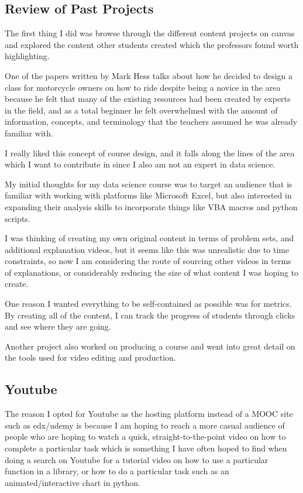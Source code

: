 \documentclass[
	letterpaper, %
]{jdf}
\begin{document}
\subsection{Review of Past Projects}
The first thing I did was browse through the different content projects on canvas and explored the content other students created which the professors found worth highlighting. 

One of the papers written by Mark Hess \cite{hess1} talks about how he decided to design a class for motorcycle owners on how to ride despite being a novice in the area because he felt that many of the existing resources had been created by experts in the field, and as a total beginner he felt overwhelmed with the amount of information, concepts, and terminology that the teachers assumed he was already familiar with.

I really liked this concept of course design, and it falls along the lines of the area which I want to contribute in since I also am not an expert in data science.

My initial thoughts for my data science course was to target an audience that is familiar with working with platforms like Microsoft Excel, but also interested in expanding their analysis skills to incorporate things like VBA macros and python scripts.

I was thinking of creating my own original content in terms of problem sets, and additional explanation videos, but it seems like this was unrealistic due to time constraints, so now I am considering the route of sourcing other videos in terms of explanations, or considerably reducing the size of what content I was hoping to create. 

One reason I wanted everything to be self-contained as possible was for metrics. By creating all of the content, I can track the progress of students through clicks and see where they are going.

Another project also worked on producing a course \citep{guida1} and went into great detail on the tools used for video editing and production. 

\subsection{Youtube}
The reason I opted for Youtube as the hosting platform instead of a MOOC site such as edx/udemy is because I am hoping to reach a more casual audience of people who are hoping to watch a quick, straight-to-the-point video on how to complete a particular task which is something I have often hoped to find when doing a search on Youtube for a tutorial video on how to use a particular function in a library, or how to do a particular task such as an animated/interactive chart in python. 
\end{document}
